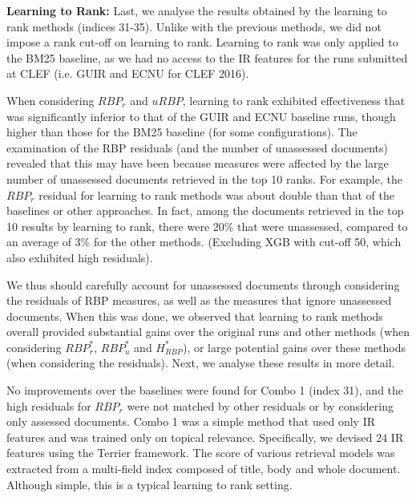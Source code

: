 \textbf{Learning to Rank:} Last, we analyse the results obtained by the learning to rank methods (indices 31-35). Unlike with the previous methods, we did not impose a rank cut-off on learning to rank. Learning to rank was only applied to the BM25 baseline, as we had no access to the IR features for the runs submitted at CLEF (i.e. GUIR and ECNU for CLEF 2016).

When considering $RBP_r$ and $uRBP$, learning to rank exhibited effectiveness that was significantly inferior to that of the GUIR and ECNU baseline runs, though higher than those for the BM25 baseline (for some configurations). The examination of the RBP residuals (and the number of unassessed documents) revealed that this may have been because measures were affected by the large number of unassessed documents retrieved in the top 10 ranks. For example, the $RBP_r$ residual for learning to rank methods was about double than that of the baselines or other approaches. In fact, among the documents retrieved in the top 10 results by learning to rank, there were 20\% that were unassessed, compared to an average of 3\% for the other methods. (Excluding XGB with cut-off 50, which also exhibited high residuals). 


We thus should carefully account for unassessed documents through considering the residuals of RBP measures, as well as the measures that ignore unassessed documents. When this was done, we observed that learning to rank methods overall provided substantial gains over the original runs and other methods (when considering $RBP^*_r$, $RBP^*_u$ and $H_{RBP}^*$), or large potential gains over these methods (when considering the residuals). Next, we analyse these results in more detail. 

No improvements over the baselines were found for Combo 1 (index 31), and the high residuals for $RBP_r$ were not matched by other residuals or by considering only assessed documents. Combo 1 was a simple method that used only IR features and was trained only on topical relevance. Specifically, we devised 24 IR features using the Terrier framework. The score of various retrieval models was extracted from a multi-field index composed of title, body and whole document. Although simple, this is a typical learning to rank setting.

